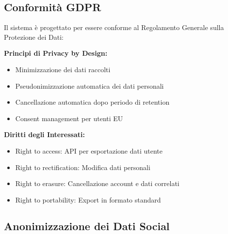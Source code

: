 \documentclass[12pt,a4paper]{report}
\begin{document}
\subsection{Conformità GDPR}

Il sistema è progettato per essere conforme al Regolamento Generale sulla Protezione dei Dati:

\textbf{Principi di Privacy by Design:}
\begin{itemize}
    \item Minimizzazione dei dati raccolti
    \item Pseudonimizzazione automatica dei dati personali
    \item Cancellazione automatica dopo periodo di retention
    \item Consent management per utenti EU
\end{itemize}

\textbf{Diritti degli Interessati:}
\begin{itemize}
    \item Right to access: API per esportazione dati utente
    \item Right to rectification: Modifica dati personali
    \item Right to erasure: Cancellazione account e dati correlati
    \item Right to portability: Export in formato standard
\end{itemize}

\subsection{Anonimizzazione dei Dati Social}
\end{document}
